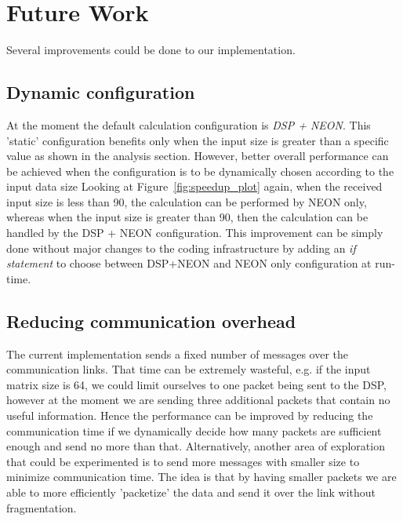 \section{Future Work}
Several improvements could be done to our implementation.

\subsection{Dynamic configuration}

At the moment the default calculation configuration is \emph{DSP + NEON}.
This 'static' configuration benefits only when the input size is greater than a specific value as shown in the analysis section.
However, better overall performance can be achieved when the 
configuration is to be dynamically chosen according to the input data size
Looking at Figure~\ref{fig:speedup_plot} again, when the received input size is less than 90, the calculation can be performed by NEON only,
whereas when the input size is greater than 90, then the calculation can be handled by the DSP + NEON configuration. This improvement can be simply done without major changes to the coding infrastructure by adding an \textit{if statement} to choose between DSP+NEON and NEON only configuration at run-time.

\subsection{Reducing communication overhead}

The current implementation sends a fixed number of messages over the communication links. That time can be extremely wasteful, e.g. if the input matrix size is 64, we could limit ourselves to one packet being sent to the DSP, 
however at the moment we are sending three additional packets that contain no useful information. Hence the performance can be improved by reducing the communication time if we dynamically decide how many packets are sufficient enough and send no more than that.
Alternatively, 
another area of exploration that could be experimented is to send more messages with smaller size to minimize communication time. The idea is that by having smaller packets we are able to more efficiently 'packetize' the data and send it over the link without fragmentation.